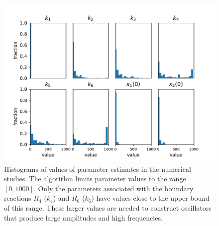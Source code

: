 \documentclass{bmcart}
\begin{document}
\begin{backmatter}
\begin{figure}
        \centering
         \includegraphics[scale=0.75]{figures/histogram_plot_both.pdf}
         \caption[]{Histograms of values of parameter estimates in the numerical studies. The algorithm limits parameter values to the range $[0, 1000]$. Only the parameters associated with the boundary reactions $R_4$ ($k_4$) and $R_6$ ($k_6$) have values close to the upper bound of this range. These larger values are needed to construct oscillators that produce large amplitudes and high frequencies.} 
         \label{fig:histogram-of-parameter-values}
\end{figure}





\end{backmatter}
\end{document}
